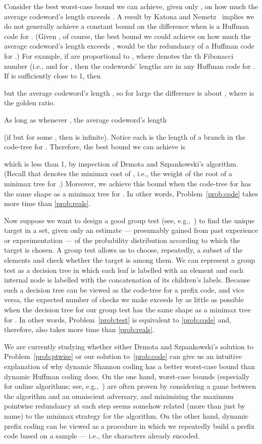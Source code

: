 \documentclass[runningheads]{llncs}
\begin{document}
Consider the best worst-case bound we can achieve, given only , on how much the average codeword's length exceeds .  A result by Katona and Nemetz~\cite{KN76} implies we do not generally achieve a constant bound on the difference when  is a Huffman code for .  (Given , of course, the best bound we could achieve on how much the average codeword's length exceeds , would be the redundancy of a Huffman code for .)  For example, if  are proportional to , where  denotes the th Fibonacci number (i.e.,  and  for , then the codewords' lengths are  in any Huffman code for .  If  is sufficiently close to 1, then

but the average codeword's length , so for large  the difference is about , where  is the golden ratio.

As long as  whenever , the average codeword's length

(if  but  for some , then  is infinite). Notice each  is the length of a branch in the code-tree for . Therefore, the best bound we can achieve is

which is less than 1, by inspection of Drmota and Szpankowski's algorithm.  (Recall that  denotes the minimax cost of , i.e., the weight of the root of a minimax tree for .)  Moreover, we achieve this bound when the code-tree for  has the same shape as a minimax tree for .  In other words, Problem~\ref{prob:code} takes  more time than \ref{prob:reals}.

Now suppose we want to design a good group test (see, e.g.,~\cite{AW87,Aig88}) to find the unique target in a set, given only an estimate  --- presumably gained from past experience or experimentation --- of the probability distribution  according to which the target is chosen.  A group test allows us to choose, repeatedly, a subset of the elements and check whether the target is among them.  We can represent a group test as a decision tree in which each leaf is labelled with an element and each internal node is labelled with the concatenation of its children's labels.  Because such a decision tree can be viewed as the code-tree for a prefix code, and vice versa, the expected number of checks we make exceeds  by as little as possible when the decision tree for our group test has the same shape as a minimax tree for .  In other words, Problem~\ref{prob:test} is equivalent to \ref{prob:code} and, therefore, also takes  more time than \ref{prob:reals}.

We are currently studying whether either Drmota and Szpankowski's solution to Problem~\ref{prob:ptwise} or our solution to~\ref{prob:code} can give us an intuitive explanation of why dynamic Shannon coding has a better worst-case bound than dynamic Huffman coding does.  On the one hand, worst-case bounds (especially for online algorithms; see, e.g.,~\cite{BE98}) are often proven by considering a game between the algorithm and an omniscient adversary, and minimizing the maximum pointwise redundancy at each step seems somehow related (more than just by name) to the minimax strategy for the algorithm.  On the other hand, dynamic prefix coding can be viewed as a procedure in which we repeatedly build a prefix code based on a sample --- i.e., the characters already encoded.
\end{document}
